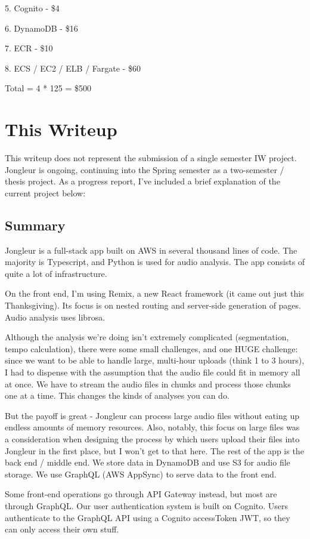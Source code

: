 \documentclass{article}
\begin{document}
5. Cognito - \$4

6. DynamoDB - \$16

7. ECR - \$10

8. ECS / EC2 / ELB / Fargate - \$60

Total = 4 * 125 = \$500

\newpage

\section{This Writeup}
This writeup does not represent the submission of a single semester IW project.
Jongleur is ongoing, continuing into the Spring semester as a two-semester / thesis project.
As a progress report, I've included a brief explanation of the current project below:

\subsection{Summary}
Jongleur is a full-stack app built on AWS in several thousand lines of code.
The majority is Typescript, and Python is used for audio analysis.
The app consists of quite a lot of infrastructure.

On the front end, I'm using Remix, a new React framework (it came out just this Thanksgiving).
Its focus is on nested routing and server-side generation of pages.
Audio analysis uses librosa.

Although the analysis we're doing isn't extremely complicated (segmentation, tempo calculation), there were some small challenges, and one HUGE challenge: since we want to be able to handle large, multi-hour uploads (think 1 to 3 hours), I had to dispense with the assumption that the audio file could fit in memory all at once. 
We have to stream the audio files in chunks and process those chunks one at a time.
This changes the kinds of analyses you can do.

But the payoff is great - Jongleur can process large audio files without eating up endless amounts of memory resources.
Also, notably, this focus on large files was a consideration when designing the process by which users upload their files into Jongleur in the first place, but I won't get to that here.
The rest of the app is the back end / middle end. We store data in DynamoDB and use S3 for audio file storage.
We use GraphQL (AWS AppSync) to serve data to the front end.

Some front-end operations go through API Gateway instead, but most are through GraphQL.
Our user authentication system is built on Cognito.
Users authenticate to the GraphQL API using a Cognito accessToken JWT, so they can only access their own stuff.
\end{document}
